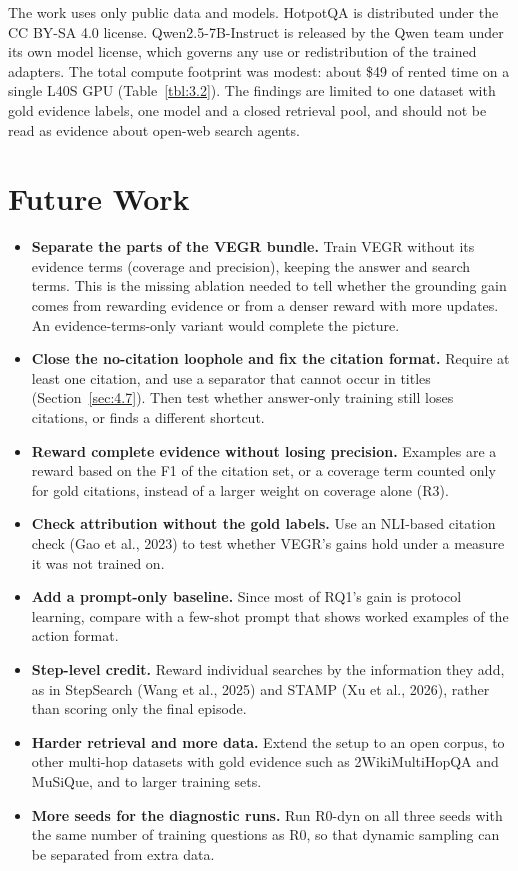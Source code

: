 The work uses only public data and models. HotpotQA is distributed under
the CC BY-SA 4.0 license. Qwen2.5-7B-Instruct is released by the Qwen
team under its own model license, which governs any use or
redistribution of the trained adapters. The total compute footprint was
modest: about \$49 of rented time on a single L40S GPU
(Table~\ref{tbl:3.2}). The findings are limited to one dataset with gold
evidence labels, one model and a closed retrieval pool, and should not
be read as evidence about open-web search agents.

\section{Future Work}\label{sec:5.5}

\begin{itemize}
\tightlist
\item
  \textbf{Separate the parts of the VEGR bundle.} Train VEGR without its
  evidence terms (coverage and precision), keeping the answer and search
  terms. This is the missing ablation needed to tell whether the
  grounding gain comes from rewarding evidence or from a denser reward
  with more updates. An evidence-terms-only variant would complete the
  picture.
\item
  \textbf{Close the no-citation loophole and fix the citation format.}
  Require at least one citation, and use a separator that cannot occur
  in titles (Section~\ref{sec:4.7}). Then test whether answer-only
  training still loses citations, or finds a different shortcut.
\item
  \textbf{Reward complete evidence without losing precision.} Examples
  are a reward based on the F1 of the citation set, or a coverage term
  counted only for gold citations, instead of a larger weight on
  coverage alone (R3).
\item
  \textbf{Check attribution without the gold labels.} Use an NLI-based
  citation check (Gao et al., 2023) to test whether VEGR's gains hold
  under a measure it was not trained on.
\item
  \textbf{Add a prompt-only baseline.} Since most of RQ1's gain is
  protocol learning, compare with a few-shot prompt that shows worked
  examples of the action format.
\item
  \textbf{Step-level credit.} Reward individual searches by the
  information they add, as in StepSearch (Wang et al., 2025) and STAMP
  (Xu et al., 2026), rather than scoring only the final episode.
\item
  \textbf{Harder retrieval and more data.} Extend the setup to an open
  corpus, to other multi-hop datasets with gold evidence such as
  2WikiMultiHopQA and MuSiQue, and to larger training sets.
\item
  \textbf{More seeds for the diagnostic runs.} Run R0-dyn on all three
  seeds with the same number of training questions as R0, so that
  dynamic sampling can be separated from extra data.
\end{itemize}
